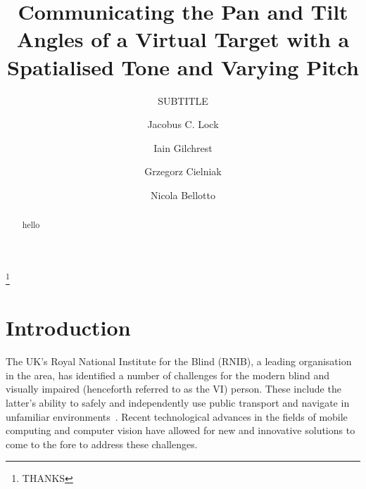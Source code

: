 \documentclass[format=sigconf, review=true, screen=true, anonymous=true]{acmart}
\begin{document}

\title[Communicating the Pan and Tilt of a Virtual Target]{Communicating the Pan and Tilt Angles of a Virtual Target with a Spatialised Tone and Varying Pitch}
\subtitle{SUBTITLE}

\author{Jacobus C. Lock}

\author{Iain Gilchrest}

\author{Grzegorz Cielniak}

\author{Nicola Bellotto}

\thanks{THANKS}



\maketitle

\begin{abstract}
  hello
\end{abstract}

\section{Introduction}

The UK's Royal National Institute for the Blind (RNIB), a leading organisation in the area, has identified a number of challenges for the modern blind and visually impaired (henceforth referred to as the VI) person. These include the latter's ability to safely and independently use public transport and navigate in unfamiliar environments~\cite{rnib-objectives}. Recent technological advances in the fields of mobile computing and computer vision have allowed for new and innovative solutions to come to the fore to address these challenges. 
\end{document}
